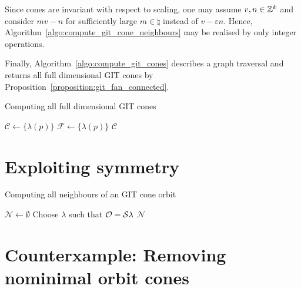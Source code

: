 \begin{remark}
	Since cones are invariant with respect to scaling, one may assume $v,n\in\mathbb{Z}^k$ and consider $mv-n$ for sufficiently large $m\in\natural$ instead of $v-\varepsilon n$. Hence, Algorithm~\ref{algo:compute_git_cone_neighbours} may be realised by only integer operations.
\end{remark}

Finally, Algorithm~\ref{algo:compute_git_cones} describes a graph traversal and returns all full dimensional GIT cones by Proposition~\ref{proposition:git_fan_connected}.

\begin{algorithm}
	\caption{Computing all full dimensional GIT cones}
	\label{algo:compute_git_cones}
	
	\BlankLine
	$\mathcal{C} \leftarrow \{\lambda(p)\}$\;
	$\mathcal{F} \leftarrow \{\lambda(p)\}$\;
	\Return $\mathcal{C}$\;
\end{algorithm}

\section{Exploiting symmetry}


\begin{algorithm}
	\caption{Computing all neighbours of an GIT cone orbit}
	\label{algo:git_cone_orbit_neighbours}
	
	\BlankLine
	$\mathcal{N} \leftarrow \emptyset$\;
	Choose $\lambda$ such that $\mathcal{O} = \mathcal{S}\lambda$\;
	\Return $\mathcal{N}$\;
\end{algorithm}

\section{Counterxample: Removing nominimal orbit cones}